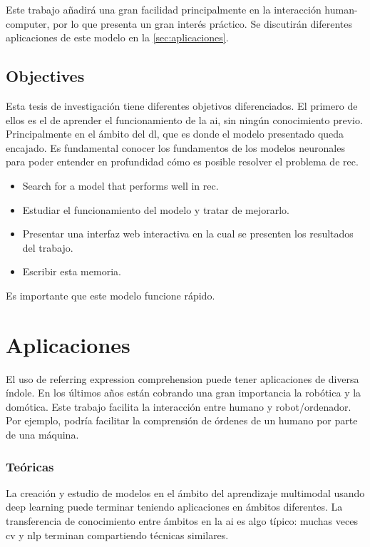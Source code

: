 Este trabajo añadirá una gran facilidad principalmente en la interacción
human-computer, por lo que presenta un gran interés práctico. Se discutirán
diferentes aplicaciones de este modelo en la \vref{sec:aplicaciones}.

\subsection{Objectives}

Esta tesis de investigación tiene diferentes objetivos diferenciados. El
primero de ellos es el de aprender el funcionamiento de la \gls{ai}, sin ningún
conocimiento previo. Principalmente en el ámbito del \gls{dl}, que es donde el
modelo presentado queda encajado. Es fundamental conocer los fundamentos de los
modelos neuronales para poder entender en profundidad cómo es posible resolver
el problema de \gls{rec}.

\begin{itemize}
  \item Search for a model that performs well in \gls{rec}.
  \item Estudiar el funcionamiento del modelo y tratar de mejorarlo.
  \item Presentar una interfaz web interactiva en la cual se presenten los
  resultados del trabajo.
  \item Escribir esta memoria.
\end{itemize}

Es importante que este modelo funcione rápido.


\section{Aplicaciones} \label{sec:aplicaciones}

El uso de referring expression comprehension puede tener aplicaciones de
diversa índole. En los últimos años están cobrando una gran importancia la
robótica y la domótica. Este trabajo facilita la interacción entre humano y
robot/ordenador. Por ejemplo, podría facilitar la comprensión de órdenes de un
humano por parte de una máquina.

\subsubsection{Teóricas}
La creación y estudio de modelos en el ámbito del aprendizaje multimodal usando
deep learning puede terminar teniendo aplicaciones en ámbitos diferentes. La
transferencia de conocimiento entre ámbitos en la \gls{ai} es algo típico:
muchas veces \gls{cv} y \gls{nlp} terminan compartiendo técnicas similares.

